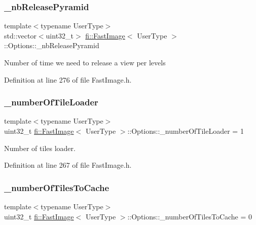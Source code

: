 \subsubsection{\texorpdfstring{\+\_\+nb\+Release\+Pyramid}{\_nbReleasePyramid}}
{\footnotesize\ttfamily template$<$typename User\+Type$>$ \\
std\+::vector$<$uint32\+\_\+t$>$ \hyperlink{classfi_1_1FastImage}{fi\+::\+Fast\+Image}$<$ User\+Type $>$\+::Options\+::\+\_\+nb\+Release\+Pyramid\hspace{0.3cm}{\ttfamily [private]}}

Number of time we need to release a view per levels 

Definition at line 276 of file Fast\+Image.\+h.

\mbox{\label{classfi_1_1FastImage_1_1Options_a81d48dcf92eecad3be50468e742ce3e5}} 
\subsubsection{\texorpdfstring{\+\_\+number\+Of\+Tile\+Loader}{\_numberOfTileLoader}}
{\footnotesize\ttfamily template$<$typename User\+Type$>$ \\
uint32\+\_\+t \hyperlink{classfi_1_1FastImage}{fi\+::\+Fast\+Image}$<$ User\+Type $>$\+::Options\+::\+\_\+number\+Of\+Tile\+Loader = 1\hspace{0.3cm}{\ttfamily [private]}}



Number of tiles loader. 



Definition at line 267 of file Fast\+Image.\+h.

\mbox{\label{classfi_1_1FastImage_1_1Options_aef0e0a6059bf90291ed2d869a10bb9bc}} 
\subsubsection{\texorpdfstring{\+\_\+number\+Of\+Tiles\+To\+Cache}{\_numberOfTilesToCache}}
{\footnotesize\ttfamily template$<$typename User\+Type$>$ \\
uint32\+\_\+t \hyperlink{classfi_1_1FastImage}{fi\+::\+Fast\+Image}$<$ User\+Type $>$\+::Options\+::\+\_\+number\+Of\+Tiles\+To\+Cache = 0\hspace{0.3cm}{\ttfamily [private]}}



